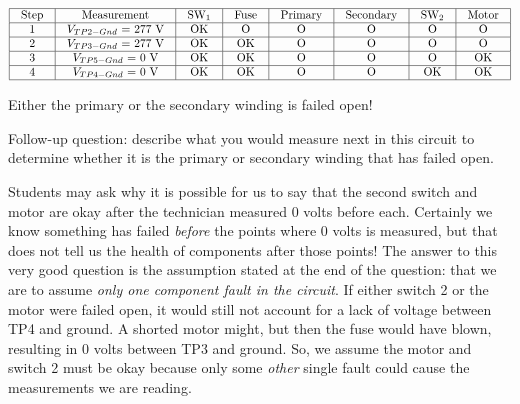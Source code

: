 






$$\vbox{\offinterlineskip
\halign{\strut
\vrule \quad\hfil # \ \hfil & 
\vrule \quad\hfil # \ \hfil & 
\vrule \quad\hfil # \ \hfil & 
\vrule \quad\hfil # \ \hfil & 
\vrule \quad\hfil # \ \hfil & 
\vrule \quad\hfil # \ \hfil & 
\vrule \quad\hfil # \ \hfil & 
\vrule \quad\hfil # \ \hfil \vrule \cr
\noalign{\hrule}
%
Step & Measurement & SW$_{1}$ & Fuse & Primary & Secondary & SW$_{2}$ & Motor \cr
%
\noalign{\hrule}
%
1 & $V_{TP2-Gnd}$ = 277 V & OK & O & O & O & O & O \cr
%
\noalign{\hrule}
%
2 & $V_{TP3-Gnd}$ = 277 V & OK & OK & O & O & O & O \cr
%
\noalign{\hrule}
%
3 & $V_{TP5-Gnd}$ = 0 V & OK & OK & O & O & O & OK \cr
%
\noalign{\hrule}
%
4 & $V_{TP4-Gnd}$ = 0 V & OK & OK & O & O & OK & OK \cr
%
\noalign{\hrule}
} %
}$$ %

Either the primary or the secondary winding is failed open!

\vskip 10pt

Follow-up question: describe what you would measure next in this circuit to determine whether it is the primary or secondary winding that has failed open.







Students may ask why it is possible for us to say that the second switch and motor are okay after the technician measured 0 volts before each.  Certainly we know something has failed {\it before} the points where 0 volts is measured, but that does not tell us the health of components after those points!  The answer to this very good question is the assumption stated at the end of the question: that we are to assume {\it only one component fault in the circuit}.  If either switch 2 or the motor were failed open, it would still not account for a lack of voltage between TP4 and ground.  A shorted motor might, but then the fuse would have blown, resulting in 0 volts between TP3 and ground.  So, we assume the motor and switch 2 must be okay because only some {\it other} single fault could cause the measurements we are reading.




